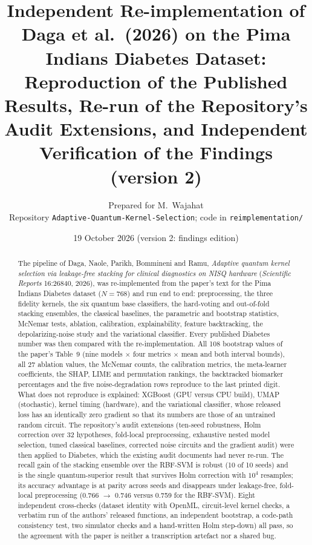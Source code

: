 \documentclass[11pt,a4paper]{article}
\title{Independent Re-implementation of Daga et al.\ (2026) on the Pima Indians Diabetes Dataset:\\
\large Reproduction of the Published Results, Re-run of the Repository's Audit Extensions, and Independent Verification of the Findings (version 2)}
\author{Prepared for M.~Wajahat \\ \small Repository \texttt{Adaptive-Quantum-Kernel-Selection}; code in \texttt{reimplementation/}}
\date{19 October 2026 (version 2: findings edition)}
\begin{document}
\maketitle

\begin{abstract}
\noindent The pipeline of Daga, Naole, Parikh, Bommineni and Ramu, \emph{Adaptive quantum kernel selection via leakage-free stacking for clinical diagnostics on NISQ hardware} (\emph{Scientific Reports} 16:26840, 2026), was re-implemented from the paper's text for the Pima Indians Diabetes dataset ($N=768$) and run end to end: preprocessing, the three fidelity kernels, the six quantum base classifiers, the hard-voting and out-of-fold stacking ensembles, the classical baselines, the parametric and bootstrap statistics, McNemar tests, ablation, calibration, explainability, feature backtracking, the depolarizing-noise study and the variational classifier. Every published Diabetes number was then compared with the re-implementation. All 108 bootstrap values of the paper's Table~9 (nine models $\times$ four metrics $\times$ mean and both interval bounds), all 27 ablation values, the McNemar counts, the calibration metrics, the meta-learner coefficients, the SHAP, LIME and permutation rankings, the backtracked biomarker percentages and the five noise-degradation rows reproduce to the last printed digit. What does not reproduce is explained: XGBoost (GPU versus CPU build), UMAP (stochastic), kernel timing (hardware), and the variational classifier, whose released loss has an identically zero gradient so that its numbers are those of an untrained random circuit. The repository's audit extensions (ten-seed robustness, Holm correction over 32 hypotheses, fold-local preprocessing, exhaustive nested model selection, tuned classical baselines, corrected noise circuits and the gradient audit) were then applied to Diabetes, which the existing audit documents had never re-run. The recall gain of the stacking ensemble over the RBF-SVM is robust (10 of 10 seeds) and is the single quantum-superior result that survives Holm correction with $10^4$ resamples; its accuracy advantage is at parity across seeds and disappears under leakage-free, fold-local preprocessing (0.766 $\to$ 0.746 versus 0.759 for the RBF-SVM). Eight independent cross-checks (dataset identity with OpenML, circuit-level kernel checks, a verbatim run of the authors' released functions, an independent bootstrap, a code-path consistency test, two simulator checks and a hand-written Holm step-down) all pass, so the agreement with the paper is neither a transcription artefact nor a shared bug.
\end{abstract}
\end{document}
